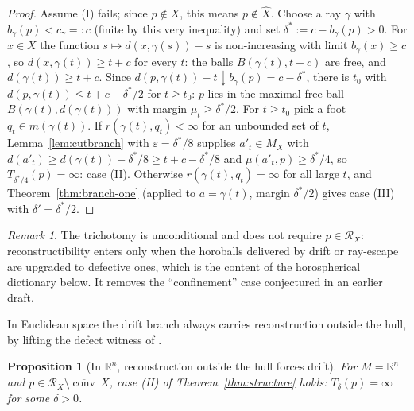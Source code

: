 \documentclass[11pt]{article}
\newtheorem{proposition}[theorem]{Proposition}
\theoremstyle{remark}
\newtheorem{remark}[theorem]{Remark}
\newcommand{\R}{\mathbb{R}}
\newcommand{\X}{X}
\newcommand{\Xhat}{\widehat{\X}}
\newcommand{\Mx}{M_{\X}}
\newcommand{\Rx}{\mathcal{R}_{\X}}
\newcommand{\conv}{\operatorname{conv}}
\newcommand{\cconv}[1]{\overline{\conv}\,#1}
\newcommand{\B}{B}
\begin{document}
\begin{proof}
Assume (I) fails; since $p\notin\X$, this means $p\notin\Xhat$.
Choose a ray $\gamma$ with $b_{\gamma}(p)<c_{\gamma}=:c$ (finite by
this very inequality) and set $\delta^{*}:=c-b_{\gamma}(p)>0$. For
$x\in\X$ the function $s\mapsto d(x,\gamma(s))-s$ is non-increasing
with limit $b_{\gamma}(x)\ge c$, so $d(x,\gamma(t))\ge t+c$ for every
$t$: the balls $\B(\gamma(t),t+c)$ are free, and
$d(\gamma(t))\ge t+c$. Since $d(p,\gamma(t))-t\downarrow
b_{\gamma}(p)=c-\delta^{*}$, there is $t_{0}$ with
$d(p,\gamma(t))\le t+c-\delta^{*}/2$ for $t\ge t_{0}$: $p$ lies in
the maximal free ball $\B(\gamma(t),d(\gamma(t)))$ with margin
$\mu_{t}\ge\delta^{*}/2$. For $t\ge t_{0}$ pick a foot
$q_{t}\in m(\gamma(t))$. If $r(\gamma(t),q_{t})<\infty$ for an
unbounded set of $t$, Lemma~\ref{lem:cutbranch} with
$\varepsilon=\delta^{*}/8$ supplies $a'_{t}\in\Mx$ with
$d(a'_{t})\ge d(\gamma(t))-\delta^{*}/8\ge t+c-\delta^{*}/8$ and
$\mu(a'_{t},p)\ge\delta^{*}/4$, so $T_{\delta^{*}/4}(p)=\infty$:
case (II). Otherwise $r(\gamma(t),q_{t})=\infty$ for all large $t$,
and Theorem~\ref{thm:branch-one} (applied to $a=\gamma(t)$, margin
$\delta^{*}/2$) gives case (III) with $\delta'=\delta^{*}/2$.
\end{proof}

\begin{remark}
The trichotomy is unconditional and does not require $p\in\Rx$:
reconstructibility enters only when the horoballs delivered by drift or
ray-escape are upgraded to defective ones, which is the content of the
horospherical dictionary below. It removes the ``confinement'' case
conjectured in an earlier draft.
\end{remark}

In Euclidean space the drift branch always carries reconstruction outside the hull, by lifting the defect witness of \cite{Notes}.

\begin{proposition}[In $\R^{n}$, reconstruction outside the hull
forces drift]\label{prop:euclidean}
For $M=\R^{n}$ and $p\in\Rx\setminus\cconv\X$, case (II) of
Theorem~\ref{thm:structure} holds: $T_{\delta}(p)=\infty$ for some
$\delta>0$.
\end{proposition}
\end{document}
